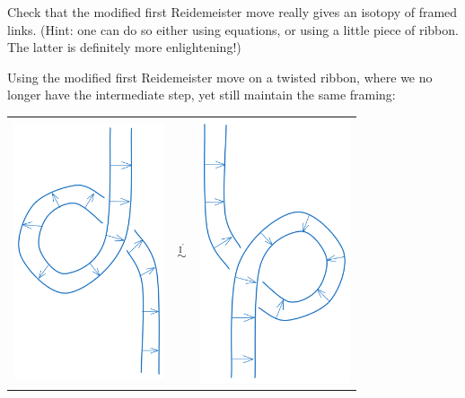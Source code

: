 \documentclass[10pt]{article}
\begin{document}
\begin{example}
	Check that the modified first Reidemeister move really gives an isotopy of framed links. (Hint: one can do so either using equations, or using a little piece of ribbon. The latter is definitely more enlightening!)
\end{example}
\sol Using the modified first Reidemeister move on a twisted ribbon, where we no longer have the intermediate step, yet still maintain the same framing:
\begin{center}
	\begin{tabular}{ m{12em} c m{12em}} 
		\includegraphics[width=12em]{figs/ribbon_1.png}&
		$\overset{\text{I}^\prime}{\sim}$&
		\includegraphics[width=12em]{figs/ribbon_2.png}
	\end{tabular}
\end{center}
\end{document}
